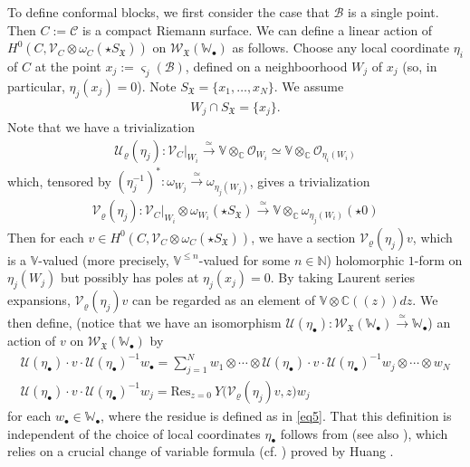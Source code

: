 \documentclass[12pt,a4paper,notitlepage]{article}
\theoremstyle{definition}
\theoremstyle{plain}
\newcommand{\fk}{\mathfrak}
\newcommand{\mc}{\mathcal}
\newcommand{\Res}{\mathrm{Res}}
\newcommand{\scr}{\mathscr}
\newcommand{\sgm}{\varsigma}
\newcommand{\SX}{{S_{\fk X}}}
\newcommand{\blt}{\bullet}
\newcommand{\Vbb}{\mathbb V}
\newcommand{\Wbb}{\mathbb W}
\newcommand{\Cbb}{\mathbb C}
\newcommand{\Nbb}{\mathbb N}
\numberwithin{equation}{section}
\begin{document}


To define conformal blocks, we first consider the case that $\mc B$ is a single point. Then $C:=\mc C$ is a compact Riemann surface. We can define a linear action of $H^0(C,\scr V_C\otimes\omega_C(\star\SX))$ on $\scr W_{\fk X}(\Wbb_\blt)$ as follows. Choose any local coordinate $\eta_i$ of $C$ at the point $x_j:=\sgm_j(\mc B)$, defined on a neighboorhood $W_j$ of $x_j$ (so, in particular, $\eta_j(x_j)=0$). Note $\SX=\{x_1,\dots,x_N\}$. We assume
\begin{align*}
W_j\cap\SX=\{x_j\}.	
\end{align*}
Note that we have a trivialization
\begin{align*}
\mc U_\varrho(\eta_j):\scr V_C|_{W_i}\xrightarrow{\simeq} \Vbb\otimes_\Cbb\scr O_{W_i}\simeq	\Vbb\otimes_\Cbb\scr O_{\eta_i(W_i)}
\end{align*} 
which, tensored by $(\eta_j^{-1})^*:\omega_{W_j}\xrightarrow{\simeq}\omega_{\eta_j(W_j)}$, gives a trivialization \index{V@$\mc V_\varrho(\eta_j)$}
\begin{align*}
\mc V_\varrho(\eta_j):\scr V_C|_{W_i}\otimes\omega_{W_i}(\star\SX)\xrightarrow{\simeq} \Vbb\otimes_\Cbb\omega_{\eta_j(W_i)}(\star 0)	
\end{align*} 
Then for each $v\in H^0(C,\scr V_C\otimes\omega_C(\star\SX))$, we have a section $\mc V_\varrho(\eta_j)v$, which is a $\Vbb$-valued (more precisely, $\Vbb^{\leq n}$-valued for some $n\in\Nbb$) holomorphic $1$-form on $\eta_j(W_j)$ but possibly has poles at $\eta_j(x_j)=0$. By taking Laurent series expansions, $\mc V_\varrho(\eta_j)v$ can be regarded as an element of $\Vbb\otimes\Cbb((z))dz$. We then define, (notice that we have an isomorphism $\mc U(\eta_\blt):\scr W_{\fk X}(\Wbb_\blt)\xrightarrow{\simeq}\Wbb_\blt$) an action of $v$ on $\scr W_{\fk X}(\Wbb_\blt)$ by
\begin{subequations}
\begin{gather}
\mc U(\eta_\blt)\cdot v\cdot \mc U(\eta_\blt)^{-1}w_\blt=\sum_{j=1}^N w_1\otimes\cdots\otimes \mc U(\eta_\blt)\cdot v\cdot \mc U(\eta_\blt)^{-1}w_j\otimes\cdots\otimes w_N\\
\mc U(\eta_\blt)\cdot v\cdot \mc U(\eta_\blt)^{-1}w_j=\Res_{z=0}~Y\big(\mc V_\varrho(\eta_j)v,z\big)w_j\label{eq63}
\end{gather}
\end{subequations}
for each $w_\blt\in\Wbb_\blt$, where the residue is defined as in \eqref{eq5}. That this definition is independent of the choice of local coordinates $\eta_\blt$ follows from \cite[Thm. 6.5.4]{FB04} (see also \cite[Thm. 3.2]{Gui20}), which relies on a crucial change of variable formula (cf. \cite[Thm. 3.3]{Gui20}) proved by Huang \cite{Hua97}.
\end{document}
